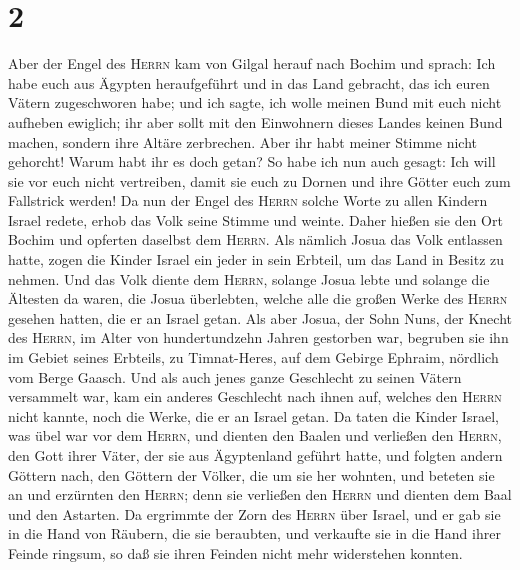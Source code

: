 \hypertarget{section-1}{%
\section{2}\label{section-1}}

 Aber der Engel des \textsc{Herrn} kam von Gilgal herauf
nach Bochim und sprach: Ich habe euch aus Ägypten heraufgeführt und in
das Land gebracht, das ich euren Vätern zugeschworen habe; und ich
sagte, ich wolle meinen Bund mit euch nicht aufheben ewiglich;
 ihr aber sollt mit den Einwohnern dieses Landes keinen
Bund machen, sondern ihre Altäre zerbrechen. Aber ihr habt meiner Stimme
nicht gehorcht! Warum habt ihr es doch getan?  So habe ich
nun auch gesagt: Ich will sie vor euch nicht vertreiben, damit sie euch
zu Dornen und ihre Götter euch zum Fallstrick werden!  Da
nun der Engel des \textsc{Herrn} solche Worte zu allen Kindern Israel
redete, erhob das Volk seine Stimme und weinte.  Daher
hießen sie den Ort Bochim und opferten daselbst dem \textsc{Herrn}.
 Als nämlich Josua das Volk entlassen hatte, zogen die
Kinder Israel ein jeder in sein Erbteil, um das Land in Besitz zu
nehmen.  Und das Volk diente dem \textsc{Herrn}, solange
Josua lebte und solange die Ältesten da waren, die Josua überlebten,
welche alle die großen Werke des \textsc{Herrn} gesehen hatten, die er
an Israel getan.  Als aber Josua, der Sohn Nuns, der
Knecht des \textsc{Herrn}, im Alter von hundertundzehn Jahren gestorben
war,  begruben sie ihn im Gebiet seines Erbteils, zu
Timnat-Heres, auf dem Gebirge Ephraim, nördlich vom Berge Gaasch.
 Und als auch jenes ganze Geschlecht zu seinen Vätern
versammelt war, kam ein anderes Geschlecht nach ihnen auf, welches den
\textsc{Herrn} nicht kannte, noch die Werke, die er an Israel getan.
 Da taten die Kinder Israel, was übel war vor dem
\textsc{Herrn}, und dienten den Baalen  und verließen den
\textsc{Herrn}, den Gott ihrer Väter, der sie aus Ägyptenland geführt
hatte, und folgten andern Göttern nach, den Göttern der Völker, die um
sie her wohnten, und beteten sie an und erzürnten den \textsc{Herrn};
 denn sie verließen den \textsc{Herrn} und dienten dem
Baal und den Astarten.  Da ergrimmte der Zorn des
\textsc{Herrn} über Israel, und er gab sie in die Hand von Räubern, die
sie beraubten, und verkaufte sie in die Hand ihrer Feinde ringsum, so
daß sie ihren Feinden nicht mehr widerstehen konnten. 

